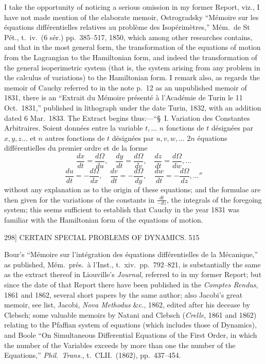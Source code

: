\documentclass[11pt]{article}
\begin{document}
I take the opportunity of noticing a serious omission in my former Report, viz., I have not made mention of the elaborate memoir, Ostrogradsky ``M\'emoire sur les \'equations diff\'erentielles relatives au probl\`eme des Isop\'erim\`etres,'' M\'em.\ de St P\'et.,  t.\ iv.\ (6 s\'er.) pp.\ 385--517, 1850, which among other researches contains, and that in the most general form, the transformation of the equations of motion from the Lagrangian to the Hamiltonian form, and indeed the transformation of the general isoperimetric system (that is, the system arising from any problem in the calculus of variations) to the Hamiltonian form. I remark also, as regards the memoir of Cauchy referred to in the note p.\ 12 as an unpublished memoir of 1831, there is an ``Extrait du M\'emoire pr\'esent\'e \`a l'Acad\'emie de Turin le 11 Oct.\ 1831,'' published in lithograph under the date Turin, 1832, with an addition dated 6 Mar.\ 1833. The Extract begins thus:---``\S\ I. Variation des Constantes Arbitraires. Soient donn\'ees entre la variable $t,\ldots$ $n$ fonctions de $t$ d\'esign\'ees par $x,y,z\ldots$ et $n$ autres fonctions de $t$ d\'esign\'ees par $u,v,w,\ldots$ $2n$ \'equations diff\'erentielles du premier ordre et de la forme
\[ \frac{dx}{dt}=\frac{d\Omega}{du},\quad \frac{dy}{dt}=\frac{d\Omega}{dv},\quad \frac{dz}{dt}=\frac{d\Omega}{dw},\ldots \]
\[ \frac{du}{dt}=-\frac{d\Omega}{dx},\quad \frac{dv}{dt}=-\frac{d\Omega}{dy},\quad \frac{dw}{dt}=-\frac{d\Omega}{dz},\ldots'' \]
without any explanation as to the origin of these equations; and the formulae are then given for the variations of the constants in $\frac{dt}{-dz}$, the integrals of the foregoing system; this seems sufficient to establish that Cauchy in the year 1831 was familiar with the Hamiltonian form of the equations of motion.

\newpage
\begin{center}
298] \hfill CERTAIN SPECIAL PROBLEMS OF DYNAMICS. \hfill 515
\end{center}

Bour's ``M\'emoire sur l'int\'egration des \'equations diff\'erentielles de la M\'ecanique,'' as published, M\'em.\ pr\'es.\ \`a l'Inst., t.\ xiv.\ pp.\ 792--821, is substantially the same as the extract thereof in Liouville's \emph{Journal}, referred to in my former Report; but since the date of that Report there have been published in the \emph{Comptes Rendus}, 1861 and 1862, several short papers by the same author; also Jacobi's great memoir, see list, Jacobi, \emph{Nova Methodus} \&c., 1862, edited after his decease by Clebsch; some valuable memoirs by Natani and Clebsch (\emph{Crelle}, 1861 and 1862) relating to the Pfaffian system of equations (which includes those of Dynamics), and Boole ``On Simultaneous Differential Equations of the First Order, in which the number of the Variables exceeds by more than one the number of the Equations,'' \emph{Phil.\ Trans.}, t.\ CLII.\ (1862), pp.\ 437--454.
\end{document}
